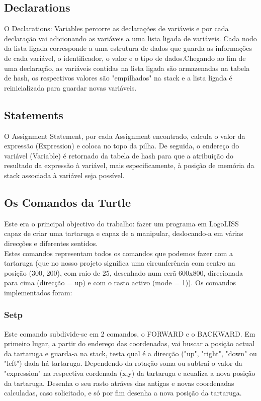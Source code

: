 \documentclass[12pt,a4paper,oneside]{article}
\newenvironment{codefold}{}{}
\begin{document}
\begin{codefold}
  \subsection{Declarations}

\indent O Declarations: Variables percorre as declarações de variáveis e por cada declaração vai adicionando as variáveis a uma lista ligada de variáveis. Cada nodo da
lista ligada corresponde a uma estrutura de dados que guarda as informações de cada variável, o identificador, o valor e o tipo de dados.Chegando ao fim de uma
declaração, as variáveis contidas na lista ligada são armazenadas na tabela de hash, os respectivos valores são "empilhados" na stack e a lista ligada é reinicializada
para guardar novas variáveis.

  \subsection{Statements}

\indent O Assignment Statement, por cada Assignment encontrado, calcula o valor da expressão (Expression) e coloca no topo da pilha. De seguida, o endereço do variável
(Variable) é retornado da tabela de hash para que a atribuição do resultado da expressão à variável, mais especificamente, à posição de memória da stack associada à
variável seja possível.\\

  \subsection{Os Comandos da Turtle}

\indent Este era o principal objectivo do trabalho: fazer um programa em LogoLISS capaz de criar uma tartaruga e capaz de a manipular, deslocando-a em várias direcções e
diferentes sentidos.\\
\indent Estes comandos representam todos os comandos que podemos fazer com a tartaruga (que no nosso projeto significa uma circunferência com centro na posição
(300, 200), com raio de 25, desenhado num ecrã 600x800, direcionada para cima (direcção = up) e com o rasto activo (mode = 1)). Os comandos implementados foram:

    \subsubsection{Setp}

\indent Este comando subdivide-se em 2 comandos, o FORWARD e o BACKWARD. Em primeiro lugar, a partir do endereço das coordenadas, vai buscar a posição actual da tartaruga
e guarda-a na stack, testa qual é a direcção ("up", "right", "down" ou "left") dada há tartaruga. Dependendo da rotação soma ou subtrai o valor da "expression" na
respectiva cordenada (x,y) da tartaruga e acualiza a nova posição da tartaruga. Desenha o seu rasto atráves das antigas e novas coordenadas calculadas, caso solicitado,
e só por fim desenha a nova posição da tartaruga.\\


\end{codefold}
\end{document}
